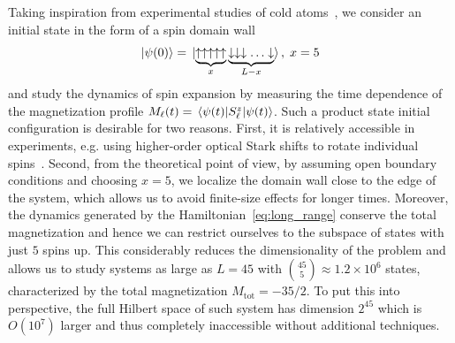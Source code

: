 Taking inspiration from experimental studies of cold atoms~\autocite{Joshi2022, Ronzheimer2013, Vidmar2013, Neyenhuis2017},
we consider an initial state in the form of a spin domain wall
\begin{equation}
  \ket{\psi(0)} = \ket*{\underbrace{\uparrow\uparrow\uparrow\uparrow\uparrow}_{x}
    \underbrace{\downarrow\downarrow\downarrow\ldots\downarrow}_{L-x}},\; x = 5
\end{equation}
and study the dynamics of spin expansion by measuring the time dependence of the magnetization profile
\(M_{\ell}(t) = \matrixel{\psi(t)}{\Sz_{\ell}}{\psi(t)}\). Such a product state initial configuration is desirable for two reasons.
First, it is relatively accessible in experiments, e.g. using higher-order optical Stark shifts to rotate individual
spins~\autocite{Lee2016}. Second, from the theoretical point of view, by assuming open boundary conditions and
choosing \(x = 5\), we localize the domain wall close to the edge of the system, which allows us to avoid finite-size effects
for longer times. Moreover, the dynamics generated by the Hamiltonian~\eqref{eq:long_range} conserve the total magnetization
and hence we can restrict ourselves to the subspace of states with just \(5\) spins up. This considerably reduces
the dimensionality of the problem and allows us to study systems as large as \(L=45\) with
\(\binom{45}{5} \approx 1.2 \times 10^6\) states, characterized by the total magnetization \(M_{\mathrm{tot}} = -35/2\).
To put this into perspective, the full Hilbert space of such system
has dimension \(2^{45}\) which is \(O(10^7)\) larger and thus completely inaccessible without additional techniques.


